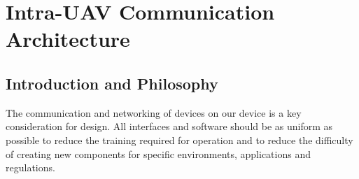 \newpage
{}
\section{Intra-UAV Communication Architecture} \label{Intra Communication}

\subsection{Introduction and Philosophy}\label{sub_section:tgt_intra_com_intro}
The communication and networking of devices on our device is a key consideration for design. All interfaces and software should be as uniform as possible to reduce the training required for operation and to reduce the difficulty of creating new components for specific environments, applications and regulations.


